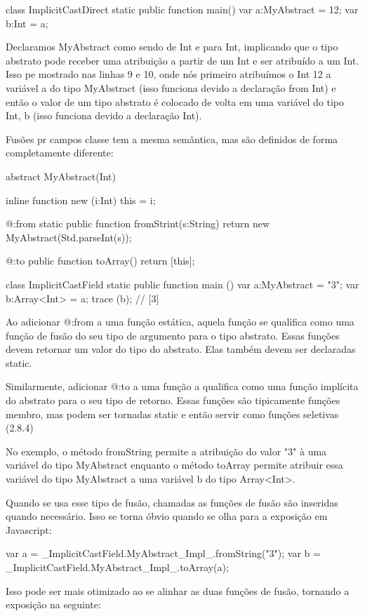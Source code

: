 {{{{{class ImplicitCastDirect {
    static public function main() {
       var a:MyAbstract = 12;
       var b:Int = a;
    }
}

Declaramos MyAbstract como sendo de Int e para Int, implicando que o tipo abstrato pode receber uma atribuição a partir de um Int e ser atribuído a um Int. Isso pe mostrado nas linhas 9 e 10, onde nós primeiro atribuímos o Int 12 a variável a do tipo MyAbstract (isso funciona devido a declaração from Int) e então o valor de um tipo abstrato é colocado de volta em uma variável do tipo Int, b (isso funciona devido a declaração Int).

Fusões pr campos classe tem a mesma semântica, mas são definidos de forma completamente diferente:

abstract MyAbstract(Int)  {
    inline function new (i:Int)  {
        this = i;
    }
    
    @:from
    static public function fromStrint(s:String)  {
        return new MyAbstract(Std.parseInt(s));
    }

   @:to
   public function toArray()  {
       return [this];
   }
}

class ImplicitCastField {
    static public function main () {
        var a:MyAbstract = "3";
        var b:Array<Int> = a;
        trace (b); // [3]
    }
}

Ao adicionar @:from a uma função estática, aquela função se qualifica como uma função de fusão do seu tipo de argumento para o tipo abstrato. Essas funções devem retornar um valor do tipo do abstrato. Elas também devem ser declaradas static.

Similarmente, adicionar @:to a uma função a qualifica como uma função implícita  do abstrato para o seu tipo de retorno. Essas funções são tipicamente funções membro, mas podem ser tornadas static e então servir como funções seletivas (2.8.4)

No exemplo, o método fromString permite a atribuição do valor "3" à uma variável do tipo MyAbstract enquanto o método toArray permite atribuir essa variável do tipo MyAbstract a uma variável b do tipo Array<Int>.

Quando se usa esse tipo de fusão, chamadas as funções de fusão são inseridas quando necessário. Isso se torna óbvio quando se olha para a exposição em Javascript:

var a = _ImplicitCastField.MyAbstract_Impl_.fromString("3");
var b = _ImplicitCastField.MyAbstract_Impl_.toArray(a);

Isso pode ser mais otimizado ao se alinhar as duas funções de fusão, tornando a exposição na seguinte:

}}}}}
